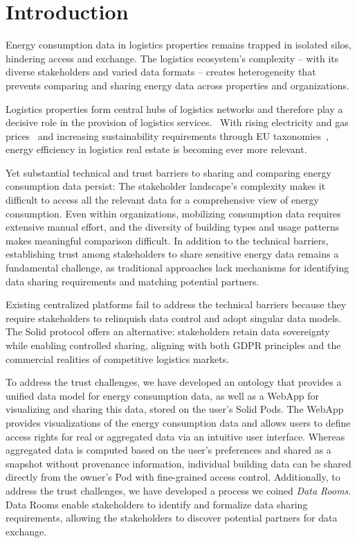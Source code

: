 \documentclass[
]{ceurart}
\begin{document}
\maketitle

\section{Introduction}
Energy consumption data in logistics properties remains trapped in isolated silos, hindering access and exchange.
The logistics ecosystem's complexity -- with its diverse stakeholders and varied data formats -- creates heterogeneity that prevents comparing and sharing energy data across properties and organizations.

Logistics properties form central hubs of logistics networks and therefore play a decisive role in the provision of logistics services.~\cite{nehm2009logistikimmobilien}
With rising electricity and gas prices~\cite{destatis_energyprices_2023} and increasing sustainability requirements through EU taxonomies~\cite{eu_taxonomy_2022}, energy efficiency in logistics real estate is becoming ever more relevant.

Yet substantial technical and trust barriers to sharing and comparing energy consumption data persist:
The stakeholder landscape's complexity makes it difficult to access all the relevant data for a comprehensive view of energy consumption.
Even within organizations, mobilizing consumption data requires extensive manual effort, and the diversity of building types and usage patterns makes meaningful comparison difficult.
In addition to the technical barriers, establishing trust among stakeholders to share sensitive energy data remains a fundamental challenge, as traditional approaches lack mechanisms for identifying data sharing requirements and matching potential partners.

Existing centralized platforms fail to address the technical barriers because they require stakeholders to relinquish data control and adopt singular data models.
The Solid protocol offers an alternative: stakeholders retain data sovereignty while enabling controlled sharing, aligning with both GDPR principles and the commercial realities of competitive logistics markets.

To address the trust challenges, we have developed an ontology that provides a unified data model for energy consumption data, as well as a WebApp for visualizing and sharing this data, stored on the user's Solid Pods.
The WebApp provides visualizations of the energy consumption data and allows users to define access rights for real or aggregated data via an intuitive user interface.
Whereas aggregated data is computed based on the user's preferences and shared as a snapshot without provenance information, individual building data can be shared directly from the owner's Pod with fine-grained access control.
Additionally, to address the trust challenges, we have developed a process we coined \emph{Data Rooms}. Data Rooms enable stakeholders to identify and formalize data sharing requirements, allowing the stakeholders to discover potential partners for data exchange.
\end{document}
